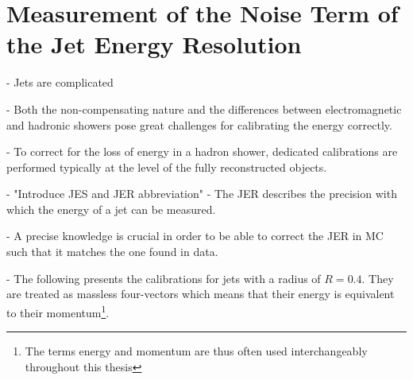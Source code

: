 \chapter{Measurement of the Noise Term of the Jet Energy Resolution}
\label{chap:calibration}

- Jets are complicated

- Both the non-compensating nature and the differences between electromagnetic and hadronic showers pose great challenges for calibrating the energy correctly.

- To correct for the loss of energy in a hadron shower, dedicated calibrations are performed typically at the level of the fully reconstructed objects.

- "Introduce JES and JER abbreviation"
- The JER describes the precision with which the energy of a jet can be measured.

- A precise knowledge is crucial in order to be able to correct the JER in MC such that it matches the one found in data.

- The following presents the calibrations for \antikt jets with a radius of $R = 0.4$. They are treated as massless four-vectors which means that their energy is equivalent to their momentum\footnote{The terms energy and momentum are thus often used interchangeably throughout this thesis}.




